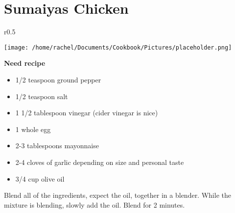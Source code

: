 \documentclass{article}
\begin{document}
\restoregeometry



\section*{\fontsize{25}{15}\selectfont Sumaiyas Chicken}



\begin{wrapfigure}{r}{0.5\textwidth}
\
  \begin{center}
 	\hfill\begin{minipage}{\textwidth}\centering
 	\vspace*{-6cm}
		\texttt{[image: /home/rachel/Documents/Cookbook/Pictures/placeholder.png]}
	\end{minipage}  
	\end{center}

\end{wrapfigure}



\vspace{5mm}

\textbf{Need recipe}
 
\vspace{5mm}
{\selectfont 
    \begin{itemize}[noitemsep]
    
      \item[] 1/2 teaspoon ground pepper
      \item[] 1/2 teaspoon salt
      \item[] 1 1/2 tablespoon vinegar (cider vinegar is nice)
      \item[] 1 whole egg
      \item[] 2-3 tablespoons mayonnaise
      \item[] 2-4 cloves of garlic depending on size and personal taste
      \item[] 3/4 cup olive oil
      
    \end{itemize}
    }
\vspace{5mm}
    
Blend all of the ingredients, expect the oil, together in a blender. While the mixture is blending, slowly add the oil. Blend for 2 minutes.
\end{document}
